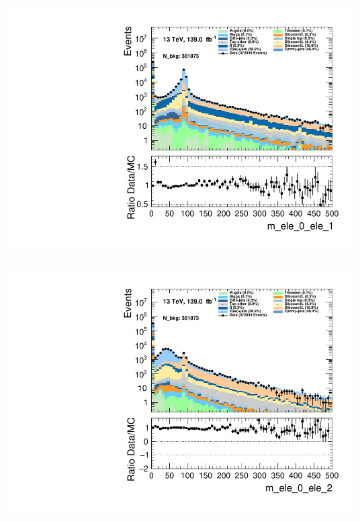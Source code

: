 \begin{figure}
\begin{subfigure}{.49\textwidth}
        \includegraphics[width=\textwidth]{Figures/MC_Data_comp/m_ele_0_ele_1.pdf}
        \caption{ }
        \label{fig:fep}
    \end{subfigure}
    \hfill
    \begin{subfigure}{.49\textwidth}
        \includegraphics[width=\textwidth]{Figures/MC_Data_comp/m_ele_0_ele_2.pdf}
        \caption{ }
        \label{fig:fe}
    \end{subfigure}
    \hfill       
    \caption{}
    \label{fig:t}
\end{figure}

